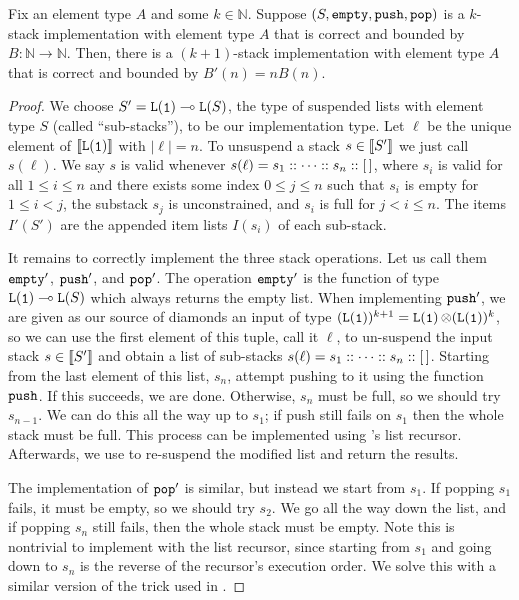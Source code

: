 \begin{lemma}
\label{lem:stack-inductive}
Fix an element type $A$ and some $k \in \mathbb N$. Suppose $(S, \mathtt{empty}, \mathtt{push}, \mathtt{pop})$ is a $k$-stack implementation with element type $A$ that is correct and bounded by $B : \mathbb N \to \mathbb N$. Then, there is a $(k + 1)$-stack implementation with element type $A$ that is correct and bounded by $B'(n) = n B(n)$. 
\end{lemma}
\begin{proof}
We choose $S' = \tparr{\tplist{\tpunit}}{\tplist{S}}$, the type of suspended lists with element type $S$ (called ``sub-stacks''), to be our implementation type. Let $\ell$ be the unique element of $\tpsem{\tplist{\tpunit}}$ with $|\ell| = n$. To unsuspend a stack $s \in \llbracket S' \rrbracket$ we just call $s(\ell)$. We say $s$ is valid whenever $s(\ell) = s_1 :: \cdots :: s_n :: [ \, ]$, where $s_i$ is valid for all $1 \le i \le n$ and there exists some index $0 \le j \le n$ such that $s_i$ is empty for $1 \le i < j$, the substack $s_j$ is unconstrained, and $s_i$ is full for $j < i \le n$. The items $I'(S')$ are the appended item lists $I(s_i)$ of each sub-stack.

It remains to correctly implement the three stack operations. Let us call them $\mathtt{empty}'$, $\mathtt{push}'$, and $\mathtt{pop}'$. The operation $\mathtt{empty}'$ is the function of type $\tparr{\tplist{\tpunit}}{\tplist{S}}$ which always returns the empty list.
%
When implementing $\mathtt{push}'$, we are given as our source of diamonds an input of type $(\tplist{\tpunit})^{k+1} = \tptens{\tplist{\tpunit}}{(\tplist{\tpunit})^k}$, so we can use the first element of this tuple, call it $\ell$, to un-suspend the input stack $s \in \llbracket S' \rrbracket$ and obtain a list of sub-stacks $s(\ell) = s_1 :: \cdots :: s_n :: [ \, ]$. Starting from the last element of this list, $s_n$, attempt pushing to it using the function $\mathtt{push}$. If this succeeds, we are done. Otherwise, $s_n$ must be full, so we should try $s_{n-1}$. We can do this all the way up to $s_1$; if push still fails on $s_1$ then the whole stack must be full. This process can be implemented using \lfpl's list recursor. Afterwards, we use  to re-suspend the modified list and return the results.

The implementation of $\mathtt{pop}'$ is similar, but instead we start from $s_1$. If popping $s_1$ fails, it must be empty, so we should try $s_2$. We go all the way down the list, and if popping $s_n$ still fails, then the whole stack must be empty. Note this is nontrivial to implement with the list recursor, since starting from $s_1$ and going down to $s_n$ is the reverse of the recursor's execution order. We solve this with a similar version of the trick used in .
\end{proof}

